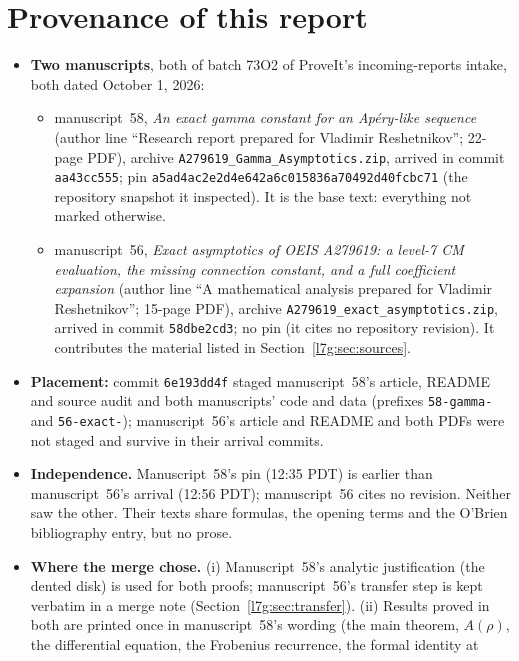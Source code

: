 \documentclass[11pt,letterpaper]{article}
\theoremstyle{remark}\newtheorem{remark}[theorem]{Remark}
\newcounter{l7gtrsavedeq}
\begin{document}
\section{Provenance of this report}\label{l7g:sec:provenance}
\begin{itemize}[leftmargin=2em]
\item \textbf{Two manuscripts}, both of batch 73O2 of ProveIt's
incoming-reports intake, both dated October 1, 2026:
  \begin{itemize}
  \item manuscript~58, \emph{An exact gamma constant for an Ap\'ery-like
  sequence} (author line ``Research report prepared for Vladimir
  Reshetnikov''; 22-page PDF), archive
  \texttt{A279619\_Gamma\_Asymptotics.zip}, arrived in commit
  \texttt{aa43cc555}; pin
  \texttt{a5ad4ac2e2d4e642a6c015836a70492d40fcbc71} (the repository
  snapshot it inspected). It is the base text: everything not marked
  otherwise.
  \item manuscript~56, \emph{Exact asymptotics of OEIS A279619: a level-7
  CM evaluation, the missing connection constant, and a full coefficient
  expansion} (author line ``A mathematical analysis prepared for Vladimir
  Reshetnikov''; 15-page PDF), archive
  \texttt{A279619\_exact\_asymptotics.zip}, arrived in commit
  \texttt{58dbe2cd3}; no pin (it cites no repository revision).
  It contributes the material listed in Section~\ref{l7g:sec:sources}.
  \end{itemize}
\item \textbf{Placement:} commit \texttt{6e193dd4f} staged manuscript~58's
article, README and source audit and both manuscripts' code and data
(prefixes \texttt{58-gamma-} and \texttt{56-exact-}); manuscript~56's
article and README and both PDFs were not staged and survive in their
arrival commits.
\item \textbf{Independence.} Manuscript~58's pin (12:35 PDT) is earlier
than manuscript~56's arrival (12:56 PDT); manuscript~56 cites no revision.
Neither saw the other. Their texts share formulas, the opening terms and
the O'Brien bibliography entry, but no prose.
\item \textbf{Where the merge chose.} (i) Manuscript~58's analytic
justification (the dented disk) is used for both proofs; manuscript~56's
transfer step is kept verbatim in a merge note
(Section~\ref{l7g:sec:transfer}). (ii) Results proved in both are printed
once in manuscript~58's wording (the main theorem, $A(\rho)$, the
differential equation, the Frobenius recurrence, the formal identity at

\end{itemize}
\end{document}
